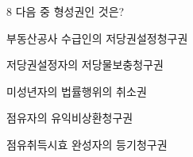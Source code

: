 \begin{question}{8}
다음 중 형성권인 것은?
\begin{choices}
  \item 부동산공사 수급인의 저당권설정청구권
  \item 저당권설정자의 저당물보충청구권
  \item 미성년자의 법률행위의 취소권
  \item 점유자의 유익비상환청구권
  \item 점유취득시효 완성자의 등기청구권
\end{choices}
\end{question}
